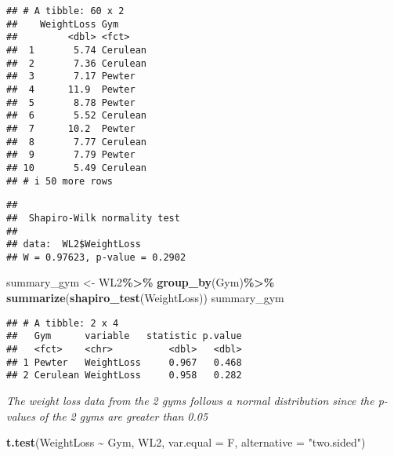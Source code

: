 \documentclass[
]{article}
\newenvironment{Shaded}{\begin{snugshade}}{\end{snugshade}}
\newcommand{\AttributeTok}[1]{\textcolor[rgb]{0.13,0.29,0.53}{#1}}
\newcommand{\FunctionTok}[1]{\textcolor[rgb]{0.13,0.29,0.53}{\textbf{#1}}}
\newcommand{\NormalTok}[1]{#1}
\newcommand{\OtherTok}[1]{\textcolor[rgb]{0.56,0.35,0.01}{#1}}
\newcommand{\SpecialCharTok}[1]{\textcolor[rgb]{0.81,0.36,0.00}{\textbf{#1}}}
\newcommand{\StringTok}[1]{\textcolor[rgb]{0.31,0.60,0.02}{#1}}
\begin{document}
\begin{verbatim}
## # A tibble: 60 x 2
##    WeightLoss Gym     
##         <dbl> <fct>   
##  1       5.74 Cerulean
##  2       7.36 Cerulean
##  3       7.17 Pewter  
##  4      11.9  Pewter  
##  5       8.78 Pewter  
##  6       5.52 Cerulean
##  7      10.2  Pewter  
##  8       7.77 Cerulean
##  9       7.79 Pewter  
## 10       5.49 Cerulean
## # i 50 more rows
\end{verbatim}

\begin{Shaded}
\end{Shaded}

\begin{verbatim}
## 
##  Shapiro-Wilk normality test
## 
## data:  WL2$WeightLoss
## W = 0.97623, p-value = 0.2902
\end{verbatim}

\begin{Shaded}
\begin{Highlighting}[]
\NormalTok{summary\_gym }\OtherTok{\textless{}{-}}\NormalTok{ WL2}\SpecialCharTok{\%\textgreater{}\%}
  \FunctionTok{group\_by}\NormalTok{(Gym)}\SpecialCharTok{\%\textgreater{}\%}
  \FunctionTok{summarize}\NormalTok{(}\FunctionTok{shapiro\_test}\NormalTok{(WeightLoss))}
\NormalTok{summary\_gym}
\end{Highlighting}
\end{Shaded}

\begin{verbatim}
## # A tibble: 2 x 4
##   Gym      variable   statistic p.value
##   <fct>    <chr>          <dbl>   <dbl>
## 1 Pewter   WeightLoss     0.967   0.468
## 2 Cerulean WeightLoss     0.958   0.282
\end{verbatim}

\emph{The weight loss data from the 2 gyms follows a normal distribution
since the p-values of the 2 gyms are greater than 0.05}

\begin{Shaded}
\begin{Highlighting}[]
\FunctionTok{t.test}\NormalTok{(WeightLoss }\SpecialCharTok{\textasciitilde{}}\NormalTok{ Gym, WL2,}
       \AttributeTok{var.equal =}\NormalTok{ F,}
       \AttributeTok{alternative =} \StringTok{"two.sided"}\NormalTok{)}
\end{Highlighting}
\end{Shaded}
\end{document}
